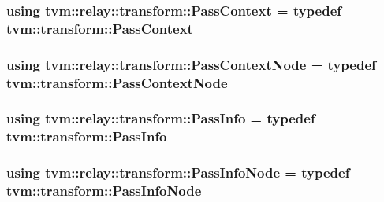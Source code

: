 \subsubsection[{\texorpdfstring{Pass\+Context}{PassContext}}]{\setlength{\rightskip}{0pt plus 5cm}using {\bf tvm\+::relay\+::transform\+::\+Pass\+Context} = typedef {\bf tvm\+::transform\+::\+Pass\+Context}}\hypertarget{namespacetvm_1_1relay_1_1transform_a744a05f8bba3c2ac238ba4569d926184}{}\label{namespacetvm_1_1relay_1_1transform_a744a05f8bba3c2ac238ba4569d926184}
\subsubsection[{\texorpdfstring{Pass\+Context\+Node}{PassContextNode}}]{\setlength{\rightskip}{0pt plus 5cm}using {\bf tvm\+::relay\+::transform\+::\+Pass\+Context\+Node} = typedef {\bf tvm\+::transform\+::\+Pass\+Context\+Node}}\hypertarget{namespacetvm_1_1relay_1_1transform_a72900733e0d3510ae61a1c287c2ec125}{}\label{namespacetvm_1_1relay_1_1transform_a72900733e0d3510ae61a1c287c2ec125}
\subsubsection[{\texorpdfstring{Pass\+Info}{PassInfo}}]{\setlength{\rightskip}{0pt plus 5cm}using {\bf tvm\+::relay\+::transform\+::\+Pass\+Info} = typedef {\bf tvm\+::transform\+::\+Pass\+Info}}\hypertarget{namespacetvm_1_1relay_1_1transform_aa405b5f11938fb8c4fa2ca21926edc9d}{}\label{namespacetvm_1_1relay_1_1transform_aa405b5f11938fb8c4fa2ca21926edc9d}
\subsubsection[{\texorpdfstring{Pass\+Info\+Node}{PassInfoNode}}]{\setlength{\rightskip}{0pt plus 5cm}using {\bf tvm\+::relay\+::transform\+::\+Pass\+Info\+Node} = typedef {\bf tvm\+::transform\+::\+Pass\+Info\+Node}}\hypertarget{namespacetvm_1_1relay_1_1transform_aae88cd0ad69cf64c7e9caf0a0c8ebb45}{}\label{namespacetvm_1_1relay_1_1transform_aae88cd0ad69cf64c7e9caf0a0c8ebb45}
